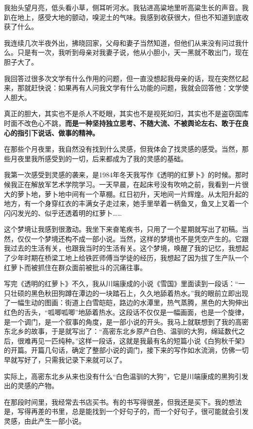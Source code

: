 \documentclass[fontset=fandol,12pt,a5paper]{ctexbook}
\begin{document}
我抬头望月亮，低头看小草，侧耳听河水。我钻进高粱地里听高粱生长的声音。我趴在地上，感受大地的颤动，嗅泥土的气味。我感到收获很大，但也不知道到底收获了什么。

我连续几次半夜外出，拂晓回家，父母和妻子当然知道，但他们从来没有问过我什么。只是有一次，我听到母亲对我妻子说，他从小胆小，天一黑就不敢出门，现在胆子大了。

我回答过很多次文学有什么作用的问题，但一直没想起我母亲的话，现在突然忆起来，那就赶快说：如果再有人问我文学有什么功能的问题，我就会回答他：文学使人胆大。

真正的胆大，其实也不是杀人不眨眼，其实也不是视死如归，其实也不是盗窃国库时面不改色心不跳，\textbf{而是一种坚持独立思考、不随大流、不被舆论左右、敢于在良心的指引下说话、做事的精神。}

在那些个月夜里，我自然没有找到什么灵感，但我体会了找灵感的感受。当然，那些月夜里我所感受到的一切，后来都成为了我的灵感的基础。

我第一次感受到灵感的袭来，是1984年冬天我写作《透明的红萝卜》的时候。那时候我正在解放军艺术学院学习。一天早晨，在起床号没有吹响之前，我看到一片很大的萝卜地，萝卜地中间有一个草棚。红日初升，天地间一片辉煌。从太阳升起的地方，有一个身穿红衣的丰满女子走过来，她手里举着一柄鱼叉，鱼叉上叉着一个闪闪发光的、似乎还透着明的红萝卜……

这个梦境让我感到很激动。我坐下来奋笔疾书，只用了一个星期就写出了初稿。当然，仅仅一个梦境还构不成一部小说。当然，这样的梦境也不是凭空产生的。它跟我过去的生活有关，也跟我当时的生活有关。这个梦境，唤醒了我的记忆，我想起了少年时期在桥梁工地上给铁匠师傅当学徒的经历，我想起了因为拔了生产队一个红萝卜而被抓住在群众面前被批斗的沉痛往事。

写完《透明的红萝卜》不久，我从川端康成的小说《雪国》里面读到一段话：“一只壮硕的黑色秋田狗蹲在潭边的一块踏石上，久久地舔着热水。”我的眼前立即出现了一幅生动的图画：街道上白雪皑皑，路边的水潭里，热气蒸腾，黑色的大狗伸出红色的舌头，“呱唧呱唧”地舔着热水。这段话不仅仅是一幅画面，也是一个旋律，是一个调门，是一个叙事的角度，是一部小说的开头。我马上就联想到了我的高密东北乡的故事，于是就写出了：“高密东北乡原产白色、温驯的大狗，绵延数代之后，很难再见一匹纯种。”这样一段话，这就是我最有名的短篇小说《白狗秋千架》的开篇。开篇几句话，确定了整部小说的调门，接下来的写作如水流淌，仿佛一切早就写好了，只需我记录下来就可以了。

实际上，高密东北乡从来也没有什么“白色温驯的大狗”，它是川端康成的黑狗引发出的灵感的产物。

在那段时间里，我经常去书店买书。有的书写得很差，但我还是买下。我的想法是，写得再差的书里，总是能找到一个好句子的，而一个好句子，很可能就会引发灵感，由此产生一部小说。
\end{document}
